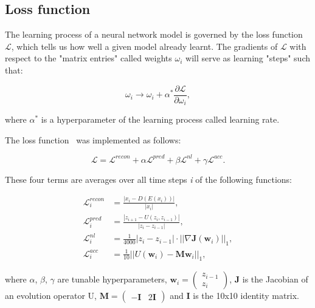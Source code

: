 \documentclass[12pt,letterpaper]{article}
\newcommand{\txt}[1]{\textit{#1}}
\newcommand{\nid}{\noindent}
\begin{document}
\subsection{Loss function}
\label{subs:loss_function}

The learning process of a neural network model is governed by the loss function $\mathcal{L}$, which tells us how well a given model already learnt. The gradients of $\mathcal{L}$ with respect to the "matrix entries" called weights $\omega_i$ will serve as learning "steps" such that:

\begin{equation*}
    \omega_i\rightarrow\omega_i +\alpha^*\frac{\partial \mathcal{L}}{\partial \omega_i},
\end{equation*}

\nid where $\alpha^*$ is a hyperparameter of the learning process called learning rate.

The loss function~\cite{Udrescu2021} was implemented as follows:

\begin{equation}
\label{eq:loss_function}
    \mathcal{L} = \mathcal{L}^{recon} + \alpha\mathcal{L}^{pred} + \beta\mathcal{L}^{nl} + \gamma\mathcal{L}^{acc}. 
\end{equation}

\nid These four terms are averages over all time steps \txt{i} of the following functions:

\begin{flushleft}
    \begin{align*}
        \mathcal{L}^{recon}_i & = \frac{|x_i-D(E(x_i))|}{|x_i|},\\
        \mathcal{L}^{pred}_i & = \frac{|z_{i+1} - U(z_i, z_{i-1})|}{|z_i - z_{i-1}|},\\
        \mathcal{L}^{nl}_i & = \frac{1}{4000}|z_i - z_{i-1}|\cdot||\nabla\boldsymbol{J}(\boldsymbol{w}_i)||_1,\\ 
        \mathcal{L}^{acc}_i & = \frac{1}{10}||U(\boldsymbol{w}_i) - \boldsymbol{M}\boldsymbol{w}_i||_1,
    \end{align*}
\end{flushleft}

\nid where $\alpha$, $\beta$, $\gamma$ are tunable hyperparameters, $\mathbf{w}_i = \begin{pmatrix} z_{i-1} \\ z_{i} \end{pmatrix}$, $\boldsymbol{J}$ is the Jacobian of an evolution operator U, $\boldsymbol{M} = \begin{pmatrix} -\boldsymbol{I} & 2\boldsymbol{I} \end{pmatrix}$ and $\boldsymbol{I}$ is the 10x10 identity matrix. 
\end{document}
